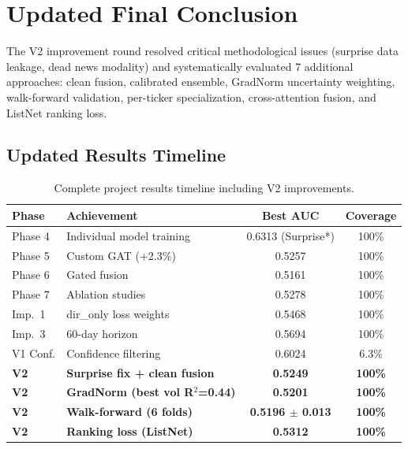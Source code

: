\documentclass[12pt,a4paper]{article}
\begin{document}
\section{Updated Final Conclusion}
\label{sec:final_conclusion_v2}

The V2 improvement round resolved critical methodological issues (surprise data leakage, dead news modality) and systematically evaluated 7 additional approaches: clean fusion, calibrated ensemble, GradNorm uncertainty weighting, walk-forward validation, per-ticker specialization, cross-attention fusion, and ListNet ranking loss.

\subsection{Updated Results Timeline}

\begin{table}[H]
\centering
\caption{Complete project results timeline including V2 improvements.}
\begin{tabular}{llcc}
\toprule
\textbf{Phase} & \textbf{Achievement} & \textbf{Best AUC} & \textbf{Coverage} \\
\midrule
Phase 4 & Individual model training & 0.6313 (Surprise*) & 100\% \\
Phase 5 & Custom GAT (+2.3\%) & 0.5257 & 100\% \\
Phase 6 & Gated fusion & 0.5161 & 100\% \\
Phase 7 & Ablation studies & 0.5278 & 100\% \\
Imp.\ 1 & dir\_only loss weights & 0.5468 & 100\% \\
Imp.\ 3 & 60-day horizon & 0.5694 & 100\% \\
V1 Conf. & Confidence filtering & 0.6024 & 6.3\% \\
\textbf{V2} & \textbf{Surprise fix + clean fusion} & \textbf{0.5249} & \textbf{100\%} \\
\textbf{V2} & \textbf{GradNorm (best vol R$^2$=0.44)} & \textbf{0.5201} & \textbf{100\%} \\
\textbf{V2} & \textbf{Walk-forward (6 folds)} & \textbf{0.5196 $\pm$ 0.013} & \textbf{100\%} \\
\textbf{V2} & \textbf{Ranking loss (ListNet)} & \textbf{0.5312} & \textbf{100\%} \\
\bottomrule
\end{tabular}
\end{table}
\end{document}
